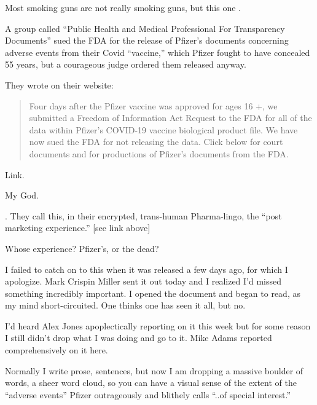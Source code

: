 \begin{refsection}
\begin{tcolorbox}[quote]
Most smoking guns are not really smoking guns, but this one .

A group called \enquote{Public Health and Medical Professional For Transparency Documents} sued the FDA for the release of Pfizer's documents concerning adverse events from their Covid \enquote{vaccine,} which Pfizer fought to have concealed 55 years, but a courageous judge ordered them released anyway.

They wrote on their website:

\begin{quote}

Four days after the Pfizer vaccine was approved for ages 16 +, we submitted\textsuperscript{\cite{urlbf81fc72}} a Freedom of Information Act Request to the FDA for all of the data within Pfizer's COVID-19 vaccine biological product file. We have now sued\textsuperscript{\cite{url1cf022ab}} the FDA for not releasing the data. Click below for court documents and for productions of Pfizer's documents from the FDA.

\end{quote}

Link.\textsuperscript{\cite{url5a9b001e}}

My God.

. They call this, in their encrypted, trans-human Pharma-lingo, the \enquote{post marketing experience.} [see link above]

Whose experience? Pfizer's, or the dead?

I failed to catch on to this when it was released a few days ago, for which I apologize. Mark Crispin Miller sent it out today and I realized I'd missed something incredibly important. I opened the document and began to read, as my mind short-circuited. One thinks one has seen it all, but no.

I'd heard Alex Jones apoplectically reporting on it this week but for some reason I still didn't drop what I was doing and go to it. Mike Adams reported comprehensively on it here.\textsuperscript{\cite{urleb56f19d}}

Normally I write prose, sentences, but now I am dropping a massive boulder of words, a sheer word cloud, so you can have a visual sense of the extent of the \enquote{adverse events} Pfizer outrageously and blithely calls \enquote{..of special interest.}


\end{tcolorbox}
\end{refsection}
